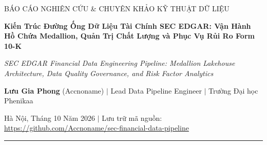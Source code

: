 \documentclass[10pt,a4paper]{article}
\begin{document}
\setcounter{page}{1}
\thispagestyle{plain}

\begin{center}
    {\scshape\footnotesize BÁO CÁO NGHIÊN CỨU \& CHUYÊN KHẢO KỸ THUẬT DỮ LIỆU\par}
    \vspace{0.25cm}
    {\Large\bfseries\color{blue!70!black} Kiến Trúc Đường Ống Dữ Liệu Tài Chính SEC EDGAR: Vận Hành Hồ Chứa Medallion, Quản Trị Chất Lượng và Phục Vụ Rủi Ro Form 10-K\par}
    \vspace{0.15cm}
    {\small\itshape SEC EDGAR Financial Data Engineering Pipeline: Medallion Lakehouse Architecture, Data Quality Governance, and Risk Factor Analytics\par}
    \vspace{0.25cm}
    {\small\textbf{Lưu Gia Phong} (Accnoname) $|$ Lead Data Pipeline Engineer $|$ Trường Đại học Phenikaa\par}
    {\footnotesize\color{gray} Hà Nội, Tháng 10 Năm 2026 $|$ Lưu trữ mã nguồn: \url{https://github.com/Accnoname/sec-financial-data-pipeline}\par}
    \vspace{0.25cm}
\end{center}
\hrule
\vspace{0.3cm}















\begingroup
\footnotesize
\setlength{\parskip}{0pt}
\setlength{\itemsep}{0pt}


\endgroup

\clearpage

\end{document}
